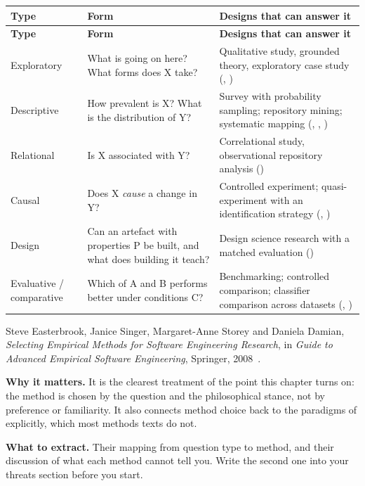 \begin{center}
\small
\begin{longtable}{@{}L{2.5cm}L{5.2cm}L{6.5cm}@{}}
\toprule
\textbf{Type} & \textbf{Form} & \textbf{Designs that can answer it} \\
\midrule
\endfirsthead
\toprule
\textbf{Type} & \textbf{Form} & \textbf{Designs that can answer it} \\
\midrule
\endhead
\bottomrule
\endfoot
Exploratory
  & What is going on here? What forms does X take?
  & Qualitative study, grounded theory, exploratory case study
    (, ) \\
Descriptive
  & How prevalent is X? What is the distribution of Y?
  & Survey with probability sampling; repository mining; systematic mapping
    (, , ) \\
Relational
  & Is X associated with Y?
  & Correlational study, observational repository analysis
    () \\
Causal
  & Does X \emph{cause} a change in Y?
  & Controlled experiment; quasi-experiment with an identification strategy
    (, ) \\
Design
  & Can an artefact with properties P be built, and what does building it
    teach?
  & Design science research with a matched evaluation
    () \\
Evaluative / comparative
  & Which of A and B performs better under conditions C?
  & Benchmarking; controlled comparison; classifier comparison across datasets
    (, ) \\
\end{longtable}
\end{center}

\begin{paperbox}
Steve Easterbrook, Janice Singer, Margaret-Anne Storey and Daniela Damian,
\emph{Selecting Empirical Methods for Software Engineering Research}, in
\emph{Guide to Advanced Empirical Software Engineering}, Springer,
2008~\cite{easterbrook2008selecting}.

\medskip
\textbf{Why it matters.} It is the clearest treatment of the point this chapter
turns on: the method is chosen by the question and the philosophical stance,
not by preference or familiarity. It also connects method choice back to the
paradigms of  explicitly, which most methods texts do not.

\medskip
\textbf{What to extract.} Their mapping from question type to method, and their
discussion of what each method cannot tell you. Write the second one into your
threats section before you start.
\end{paperbox}

